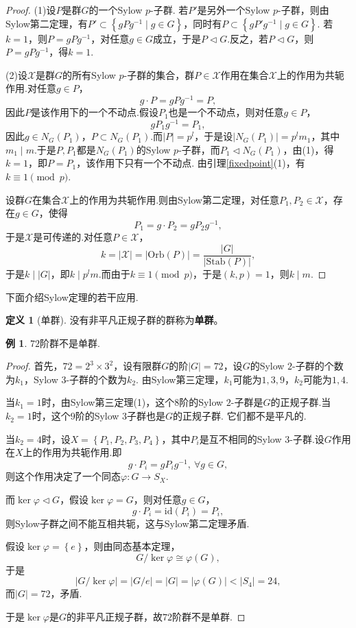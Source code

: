 \documentclass[12pt]{ctexart}
\theoremstyle{definition}
\newtheorem{definition}{定义}
\newtheorem{example}{例}
\theoremstyle{plain}
\newcommand{\id}{\mathrm{id}}
\newcommand{\Orb}{\mathrm{Orb}}
\newcommand{\Stab}{\mathrm{Stab}}
\begin{document}
	\begin{proof}
		(1)设$P$是群$G$的一个Sylow $p$-子群. 若$P'$是另外一个Sylow $p$-子群，则由Sylow第二定理，有$P'\subset\left\{gPg^{-1}\mid g\in G\right\}$，同时有$P\subset\left\{gP'g^{-1}\mid g\in G\right\}$. 若$k=1$，则$P=gPg^{-1}$，对任意$g\in G$成立，于是$P\lhd G$.反之，若$P\lhd G$，则$P=gPg^{-1}$，得$k=1$.
		
		(2)设$\mathcal{X}$是群$G$的所有Sylow $p$-子群的集合，群$P\in\mathcal{X}$作用在集合$\mathcal{X}$上的作用为共轭作用.对任意$g\in P$，
		$$g\cdot P=gPg^{-1}=P,$$
		因此$P$是该作用下的一个不动点.假设$P_1$也是一个不动点，则对任意$g\in P$，
		$$gP_1g^{-1}=P_1,$$
		因此$g\in N_G(P_1)$，$P\subset N_G(P_1)$.而$|P|=p^l$，于是设$|N_G(P_1)|=p^lm_1$，其中$m_1\mid m$.于是$P,P_1$都是$N_G(P_1)$的Sylow $p$-子群，而$P_1\lhd N_G(P_1)$，由(1)，得$k=1$，即$P=P_1$，该作用下只有一个不动点. 由引理\ref{fixedpoint}(1)，有$k\equiv 1\pmod p$.
		
		设群$G$在集合$\mathcal{X}$上的作用为共轭作用.则由Sylow第二定理，对任意$P_1,P_2\in\mathcal{X}$，存在$g\in G$，使得
		$$P_1=g\cdot P_2=gP_2g^{-1},$$
		于是$\mathcal{X}$是可传递的.对任意$P\in\mathcal{X}$，
		$$k=|\mathcal{X}|=|\Orb(P)|=\frac{|G|}{|\Stab(P)|},$$
		于是$k\mid|G|$，即$k\mid p^lm$.而由于$k\equiv 1\pmod p$，于是$(k,p)=1$，则$k\mid m$.
	\end{proof}
	下面介绍Sylow定理的若干应用.
	\begin{definition}[单群]
		没有非平凡正规子群的群称为\textbf{单群}。
	\end{definition}
	\begin{example}
		$72$阶群不是单群.
	\end{example}
	\begin{proof}
		首先，$72=2^3\times3^2$，设有限群$G$的阶$|G|=72$，设$G$的Sylow $2$-子群的个数为$k_1$，Sylow $3$-子群的个数为$k_2$. 由Sylow第三定理，$k_1$可能为$1,3,9$，$k_2$可能为$1,4$.
		
		当$k_1=1$时，由Sylow第三定理(1)，这个$8$阶的Sylow $2$-子群是$G$的正规子群.当$k_2=1$时，这个$9$阶的Sylow $3$子群也是$G$的正规子群. 它们都不是平凡的.
		
		当$k_2=4$时，设$X=\left\{P_1,P_2,P_3,P_4\right\}$，其中$P_i$是互不相同的Sylow $3$-子群.设$G$作用在$X$上的作用为共轭作用.即
		$$g\cdot P_i=gP_ig^{-1},\ \forall g\in G,$$
		则这个作用决定了一个同态$\varphi:G\to S_X$.
		
		而$\ker\varphi\lhd G$，假设$\ker\varphi=G$，则对任意$g\in G$，
		$$g\cdot P_i=\id(P_i)=P_i,$$
		则Sylow子群之间不能互相共轭，这与Sylow第二定理矛盾.
		
		假设$\ker\varphi=\left\{e\right\}$，则由同态基本定理，
		$$G/\ker\varphi\cong\varphi(G),$$
		于是
		$$|G/\ker\varphi|=|G/e|=|G|=|\varphi(G)|<|S_4|=24,$$
		而$|G|=72$，矛盾.
		
		于是$\ker\varphi$是$G$的非平凡正规子群，故$72$阶群不是单群.
	\end{proof}
\end{document}
